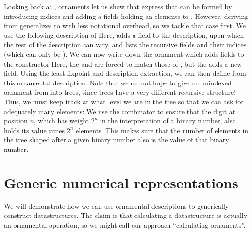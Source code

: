 Looking back at , ornaments let us show that express that  can be formed by introducing indices and adding a fields holding an elements to \bN{}.%
However, deriving  from \bN{} generalizes to \bL{} with less notational overhead, so we tackle that case first. We use the following description of \bN{}
Here,  adds a field to the description, upon which the rest of the description can vary, and  lists the recursive fields and their indices (which can only be ).
We can now write down the ornament which adds fields to the  constructor
Here, the  and  are forced to match those of ,
but the  adds a new field. Using the least fixpoint and description extraction, we can then define  from this ornamental description. Note that we cannot hope to give an unindexed ornament from \bL{}
into trees, since trees have a very different recursive structure! Thus, we must keep track at what level we are in the tree so that we can ask for adequately many elements:
We use the  combinator to ensure that the digit at position $n$, which has weight $2^n$ in the interpretation of a binary number, also holds its value times $2^n$ elements. This makes sure that the number of elements in the tree shaped after a given binary number also is the value of that  binary number.


\section{Generic numerical representations}\label{sec:trieo}
We will demonstrate how we can use ornamental descriptions to generically construct datastructures. The claim is that calculating a datastructure is actually an ornamental operation, so we might call our approach ``calculating ornaments''. 


